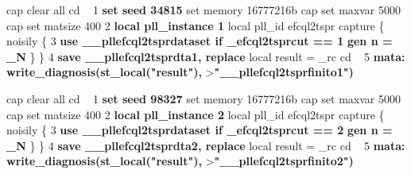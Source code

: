 \def\anchomini{.6\textwidth}
\begin{minipage}[c]{\anchomini}
\begin{semiverbatim}
  cap clear all
  cd ~
1 {\bf{}set seed 34815}
  set memory 16777216b
  cap set maxvar 5000
  cap set matsize 400
2 {\bf{}local pll\_instance 1}
  local pll_id efcql2tspr
  capture \{
  noisily \{
3 {\bf{}use \_\_pllefcql2tsprdataset if \_efcql2tsprcut == 1}
  {\bf{}gen n = \_N}
  \}
  \}
4 {\bf{}save \_\_pllefcql2tsprdta1, replace}
  local result = _rc
  cd ~
5 {\bf{}mata: write\_diagnosis(st\_local("result"),}
  >{\bf{}"\_\_pllefcql2tsprfinito1")}
\end{semiverbatim}
\end{minipage}\pause{}
\begin{minipage}[c]{\anchomini}
\begin{semiverbatim}
  cap clear all
  cd ~
1 {\bf{}set seed 98327}
  set memory 16777216b
  cap set maxvar 5000
  cap set matsize 400
2 {\bf{}local pll\_instance 2}
  local pll_id efcql2tspr
  capture \{
  noisily \{
3 {\bf{}use \_\_pllefcql2tsprdataset if \_efcql2tsprcut == 2}
  {\bf{}gen n = \_N}
  \}
  \}
4 {\bf{}save \_\_pllefcql2tsprdta2, replace}
  local result = _rc
  cd ~
5 {\bf{}mata: write\_diagnosis(st\_local("result"),}
  >{\bf{}"\_\_pllefcql2tsprfinito2")}
\end{semiverbatim}
\end{minipage}
